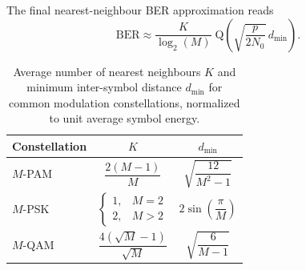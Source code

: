 The final nearest-neighbour \ac{BER} approximation reads
\begin{equation}
\label{eq:ber_nn_approximation}
    \mathrm{BER} \approx \frac{K}{\log_2(M)}\; \mathrm{Q}\!\left(\sqrt{\frac{p}{2N_0}}\,d_{\min}\right).
\end{equation}

\begin{table}[!htb]
    \vspace{0.5cm}
    \centering
    \setlength{\tabcolsep}{15pt}
    \begin{tabular}{lcc}
        \toprule
        Constellation & $K$ & $d_{\min}$ \\
        \midrule
        \rule{0pt}{5.25ex}$M$-PAM &
            $\dfrac{2(M-1)}{M}$ &
            $\sqrt{\dfrac{12}{M^2-1}}$ \\
        \rule{0pt}{5.25ex}$M$-PSK &
            $\begin{cases} 1, & M = 2 \\ 2, & M > 2 \end{cases}$ &
            $2\sin\!\left(\dfrac{\pi}{M}\right)$ \\
        \rule{0pt}{5.25ex}$M$-QAM &
            $\dfrac{4(\sqrt{M}-1)}{\sqrt{M}}$ &
            $\sqrt{\dfrac{6}{M-1}}$ \\
        \bottomrule
    \end{tabular}
    \caption[Nearest-neighbour parameters for common constellations]{%
        Average number of nearest neighbours $K$ and minimum inter-symbol distance
        $d_{\min}$ for common modulation constellations, normalized to unit average
        symbol energy.}
    \label{table:K_and_dmin_values}
\end{table}


